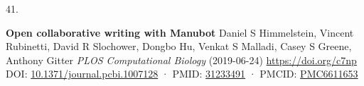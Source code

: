 \documentclass[
]{article}
\newlength{\cslhangindent}
\newlength{\csllabelwidth}
\newlength{\cslentryspacingunit} %
\newenvironment{CSLReferences}[2] %
 {%
  \setlength{\parindent}{0pt}
  \ifodd #1
  \let\oldpar\par
  \def\par{\hangindent=\cslhangindent\oldpar}
  \fi
  \setlength{\parskip}{#2\cslentryspacingunit}
 }%
 {}
\newcommand{\CSLBlock}[1]{#1\hfill\break}
\newcommand{\CSLLeftMargin}[1]{\parbox[t]{\csllabelwidth}{#1}}
\newcommand{\CSLRightInline}[1]{\parbox[t]{\linewidth - \csllabelwidth}{#1}\break}
\begin{document}
\begin{CSLReferences}{0}{0}
\leavevmode{}%
\CSLLeftMargin{41. }%
\CSLRightInline{\textbf{Open collaborative writing with Manubot}
\CSLBlock{Daniel S Himmelstein, Vincent Rubinetti, David R Slochower, Dongbo Hu, Venkat S Malladi, Casey S Greene, Anthony Gitter} \emph{PLOS Computational Biology} (2019-06-24) \url{https://doi.org/c7np}
\CSLBlock{DOI: \href{https://doi.org/10.1371/journal.pcbi.1007128}{10.1371/journal.pcbi.1007128} · PMID: \href{https://www.ncbi.nlm.nih.gov/pubmed/31233491}{31233491} · PMCID: \href{https://www.ncbi.nlm.nih.gov/pmc/articles/PMC6611653}{PMC6611653}}}

\end{CSLReferences}
\end{document}
